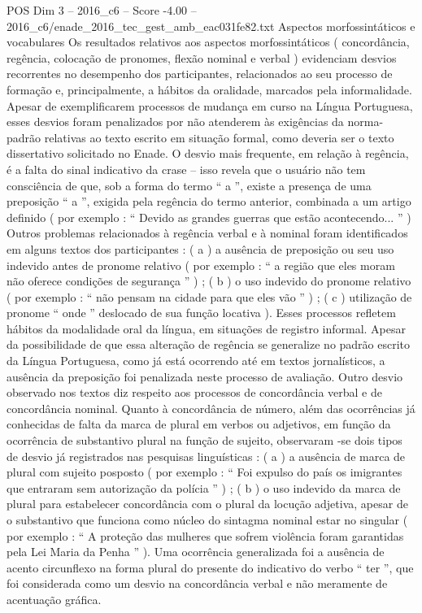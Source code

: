 \begin{textsample}{POS Dim 3 – 2016\_c6 – Score -4.00 – 2016\_c6/enade\_2016\_tec\_gest\_amb\_eac031fe82.txt}
Aspectos morfossintáticos e vocabulares Os resultados relativos aos aspectos morfossintáticos ( concordância, regência, colocação de pronomes, flexão nominal e verbal ) evidenciam desvios recorrentes no desempenho dos participantes, relacionados ao seu processo de formação e, principalmente, a hábitos da oralidade, marcados pela informalidade.
Apesar de exemplificarem processos de mudança em curso na Língua Portuguesa, esses desvios foram penalizados por não atenderem às exigências da norma-padrão relativas ao texto escrito em situação formal, como deveria ser o texto dissertativo solicitado no Enade.
O desvio mais frequente, em relação à regência, é a falta do sinal indicativo da crase – isso revela que o usuário não tem consciência de que, sob a forma do termo “ a ”, existe a presença de uma preposição “ a ”, exigida pela regência do termo anterior, combinada a um artigo definido ( por exemplo : “ Devido as grandes guerras que estão acontecendo... ” ) Outros problemas relacionados à regência verbal e à nominal foram identificados em alguns textos dos participantes : ( a ) a ausência de preposição ou seu uso indevido antes de pronome relativo ( por exemplo : “ a região que eles moram não oferece condições de segurança ” ) ; ( b ) o uso indevido do pronome relativo ( por exemplo : “ não pensam na cidade para que eles vão ” ) ; ( c ) utilização de pronome “ onde ” deslocado de sua função locativa ).
Esses processos refletem hábitos da modalidade oral da língua, em situações de registro informal.
Apesar da possibilidade de que essa alteração de regência se generalize no padrão escrito da Língua Portuguesa, como já está ocorrendo até em textos jornalísticos, a ausência da preposição foi penalizada neste processo de avaliação.
Outro desvio observado nos textos diz respeito aos processos de concordância verbal e de concordância nominal.
Quanto à concordância de número, além das ocorrências já conhecidas de falta da marca de plural em verbos ou adjetivos, em função da ocorrência de substantivo plural na função de sujeito, observaram -se dois tipos de desvio já registrados nas pesquisas linguísticas : ( a ) a ausência de marca de plural com sujeito posposto ( por exemplo : “ Foi expulso do país os imigrantes que entraram sem autorização da polícia ” ) ; ( b ) o uso indevido da marca de plural para estabelecer concordância com o plural da locução adjetiva, apesar de o substantivo que funciona como núcleo do sintagma nominal estar no singular ( por exemplo : “ A proteção das mulheres que sofrem violência foram garantidas pela Lei Maria da Penha ” ).
Uma ocorrência generalizada foi a ausência de acento circunflexo na forma plural do presente do indicativo do verbo “ ter ”, que foi considerada como um desvio na concordância verbal e não meramente de acentuação gráfica.

\end{textsample}

